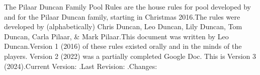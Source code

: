 
\renewcommand{\thesection}{\Alph{section}}



The Pilaar Duncan Family Pool Rules are the house rules for pool developed by and for the Pilaar Duncan family, starting in Christmas 2016.\standardspace[large]
The rules were developed by (alphabetically) Chris Duncan, Leo Duncan, Lily Duncan, Tom Duncan, Carla Pilaar, \& Mark Pilaar.\standardspace[large]
This document was written by Leo Duncan.\standardspace[large]
Version 1 (2016) of these rules existed orally and in the minds of the players. Version 2 (2022) was a partially completed Google Doc. This is Version 3 (2024).\standardspace[large]
Current Version: \currentversion.\standardspace[large]
Last Revision: \currentversiondate.\standardspace[large]
Changes: {\small \githublink}

\newpage


